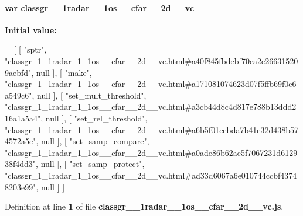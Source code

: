 \paragraph[{classgr\+\_\+1\+\_\+1radar\+\_\+1\+\_\+1os\+\_\+\+\_\+cfar\+\_\+\+\_\+2d\+\_\+\+\_\+vc}]{\setlength{\rightskip}{0pt plus 5cm}var classgr\+\_\+\_\+1radar\+\_\+\_\+1os\+\_\+\+\_\+cfar\+\_\+\+\_\+2d\+\_\+\+\_\+vc}\label{classgr__1__1radar__1__1os____cfar____2d____vc_8js_a4aaccce2af00c548450c987494b67334}
{\bfseries Initial value\+:}
\begin{DoxyCode}
=
[
    [ \textcolor{stringliteral}{"sptr"}, \textcolor{stringliteral}{"classgr\_1\_1radar\_1\_1os\_\_cfar\_\_2d\_\_vc.html#a40f845fbdebf70ea2e266315209aebfd"}, null ],
    [ \textcolor{stringliteral}{"make"}, \textcolor{stringliteral}{"classgr\_1\_1radar\_1\_1os\_\_cfar\_\_2d\_\_vc.html#a171081074623d07f5ffb69f0e6a549c6"}, null ],
    [ \textcolor{stringliteral}{"set\_mult\_threshold"}, \textcolor{stringliteral}{"classgr\_1\_1radar\_1\_1os\_\_cfar\_\_2d\_\_vc.html#a3cb44d8c4d817e788b13ddd216a1a5a4"}, 
      null ],
    [ \textcolor{stringliteral}{"set\_rel\_threshold"}, \textcolor{stringliteral}{"classgr\_1\_1radar\_1\_1os\_\_cfar\_\_2d\_\_vc.html#a6b5f01cebda7b41e32d438b574572a5c"}, 
      null ],
    [ \textcolor{stringliteral}{"set\_samp\_compare"}, \textcolor{stringliteral}{"classgr\_1\_1radar\_1\_1os\_\_cfar\_\_2d\_\_vc.html#a0ade86b62ae5f7067231d612938f4dd3"}, 
      null ],
    [ \textcolor{stringliteral}{"set\_samp\_protect"}, \textcolor{stringliteral}{"classgr\_1\_1radar\_1\_1os\_\_cfar\_\_2d\_\_vc.html#ad33d6067a6e010744ccbf43748203e99"}, 
      null ]
]
\end{DoxyCode}


Definition at line {\bf 1} of file {\bf classgr\+\_\+\_\+1radar\+\_\+\_\+1os\+\_\+\+\_\+cfar\+\_\+\+\_\+2d\+\_\+\+\_\+vc.\+js}.

